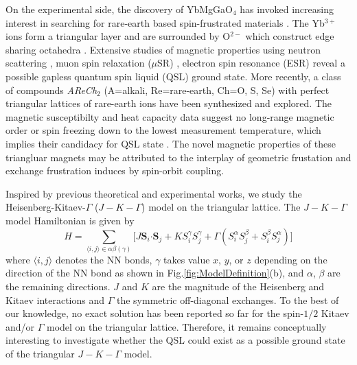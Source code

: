 \documentclass[aps,prb,reprint,amsfonts,amsmath,amssymb,showpacs,groupedaddress,superscriptaddress]{revtex4-1}
\begin{document}
On the experimental side, the discovery of YbMgGaO$_4$ has invoked increasing interest in searching for rare-earth based spin-frustrated materials \cite{srep16419,PhysRevLett.115.167203,PhysRevB.94.035107,PhysRevB.96.054445,PhysRevB.97.184413,PhysRevB.97.125105,PhysRevB.96.075105,PhysRevLett.119.157201}. The Yb$^{3+}$ ions form a triangular layer and are surrounded by O$^{2-}$ which construct edge sharing octahedra \cite{srep16419,PhysRevLett.115.167203}. Extensive studies of magnetic properties using neutron scattering \cite{Nature20614,nphys3971,PhysRevLett.117.267202,PhysRevX.8.031001}, muon spin relaxation ($\mu$SR) \cite{PhysRevLett.117.097201}, electron spin resonance (ESR) \cite{PhysRevLett.115.167203} reveal a possible gapless quantum spin liquid (QSL) ground state. More recently, a class of compounds \emph{AReCh}$_2$ (A=alkali, Re=rare-earth, Ch=O, S, Se) with perfect triangular lattices of rare-earth ions have been synthesized and explored. The magnetic susceptibilty and heat capacity data suggest no long-range magnetic order or spin freezing down to the lowest measurement temperature, which implies their candidacy for QSL state \cite{acsmaterialslett.9b00464,PhysRevMaterials.3.114413,arXiv1911.08036,Liu_2018,arXiv1911.12712}. The novel magnetic properties of these triangluar magnets may be attributed to the interplay of geometric frustation and exchange frustration induces by spin-orbit coupling.

Inspired by previous theoretical and experimental works, we study the Heisenberg-Kitaev-$\Gamma$ ($J-K-\Gamma$) model on the triangular lattice. The $J-K-\Gamma$ model Hamiltonian is given by
\begin{equation}
    H=\sum_{\langle i,j \rangle \in \alpha \beta (\gamma)} \lbrack J \bm{S}_i \bm{\cdot} \bm{S}_j + K S_i^{\gamma} S_j^{\gamma} + \Gamma (S_i^{\alpha} S_j^{\beta} + S_i^{\beta} S_j^{\alpha}) \rbrack
    \label{eq:Hamiltonian}
\end{equation}
where $\langle i,j \rangle$ denotes the NN bonds, $\gamma$ takes value $x$, $y$, or $z$ depending on the direction of the NN bond as shown in Fig.\ref{fig:ModelDefinition}(b), and $\alpha$, $\beta$ are the remaining directions. $J$ and $K$ are the magnitude of the Heisenberg and Kitaev interactions and $\Gamma$ the symmetric off-diagonal exchanges. To the best of our knowledge, no exact solution has been reported so far for the spin-$1/2$ Kitaev and/or $\Gamma$ model on the triangular lattice. Therefore, it remains conceptually interesting to investigate whether the QSL could exist as a possible ground state of the triangular $J-K-\Gamma$ model.
\end{document}

